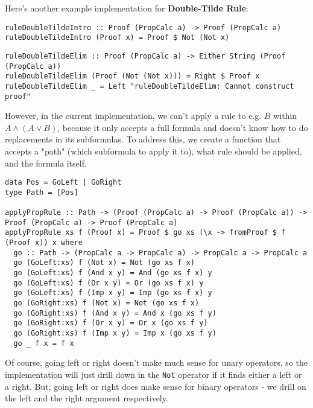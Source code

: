 \documentclass{article}
\begin{document}
Here's another example implementation for \textbf{Double-Tilde Rule}:

\begin{minipage}{0.49\textwidth}
\begin{lstlisting}
ruleDoubleTildeIntro :: Proof (PropCalc a) -> Proof (PropCalc a)
ruleDoubleTildeIntro (Proof x) = Proof $ Not (Not x)
\end{lstlisting}
\end{minipage}
\begin{minipage}{0.49\textwidth}
\begin{lstlisting}
ruleDoubleTildeElim :: Proof (PropCalc a) -> Either String (Proof (PropCalc a))
ruleDoubleTildeElim (Proof (Not (Not x))) = Right $ Proof x
ruleDoubleTildeElim _ = Left "ruleDoubleTildeElim: Cannot construct proof"
\end{lstlisting}
\end{minipage}

However, in the current implementation, we can't apply a rule to e.g. $B$ within $A \land (A \lor B)$, because it only accepts a full formula and doesn't know how to do replacements in its subformulas. To address this, we create a function that accepts a "path" (which subformula to apply it to), what rule should be applied, and the formula itself.

\begin{lstlisting}
data Pos = GoLeft | GoRight
type Path = [Pos]

applyPropRule :: Path -> (Proof (PropCalc a) -> Proof (PropCalc a)) -> Proof (PropCalc a) -> Proof (PropCalc a)
applyPropRule xs f (Proof x) = Proof $ go xs (\x -> fromProof $ f (Proof x)) x where
  go :: Path -> (PropCalc a -> PropCalc a) -> PropCalc a -> PropCalc a
  go (GoLeft:xs) f (Not x) = Not (go xs f x)
  go (GoLeft:xs) f (And x y) = And (go xs f x) y
  go (GoLeft:xs) f (Or x y) = Or (go xs f x) y
  go (GoLeft:xs) f (Imp x y) = Imp (go xs f x) y
  go (GoRight:xs) f (Not x) = Not (go xs f x)
  go (GoRight:xs) f (And x y) = And x (go xs f y)
  go (GoRight:xs) f (Or x y) = Or x (go xs f y)
  go (GoRight:xs) f (Imp x y) = Imp x (go xs f y)
  go _ f x = f x
\end{lstlisting}

Of course, going left or right doesn't make much sense for unary operators, so the implementation will just drill down in the \texttt{Not} operator if it finds either a left or a right. But, going left or right does make sense for binary operators - we drill on the left and the right argument respectively.
\end{document}
